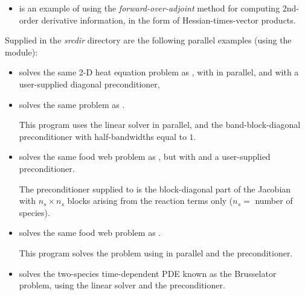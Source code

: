 \begin{itemize}

\item {}
  is an example of using the {\em forward-over-adjoint} method for
  computing 2nd-order derivative information, in the form of Hessian-times-vector
  products.

\end{itemize}


\vspace{0.2in}\noindent 
Supplied in the {\em srcdir} directory are
the following parallel examples (using the {\nvecp} module):

\begin{itemize}


\item {}
  solves the same 2-D heat equation problem as , with {\idaspgmr}
  in parallel, and with a user-supplied diagonal preconditioner,
  
\item {}
  solves the same problem as .

  This program uses the {\idaspgmr} linear solver in parallel,
  and the band-block-diagonal preconditioner {\idabbdpre} with half-bandwidths 
  equal to $1$.

\item {}
  solves the same food web problem as , but with {\idaspgmr}
  and a user-supplied preconditioner.
  
  The preconditioner supplied to {\idaspgmr} is the block-diagonal part of 
  the Jacobian with $n_s \times n_s$ blocks arising from the reaction terms only
  ($n_s =$ number of species).

\item {}
  solves the same food web problem as .

  This program solves the problem using {\idaspgmr} in parallel and the
  {\idabbdpre} preconditioner.

\item {}
  solves the two-species time-dependent PDE known as the Brusselator problem,
  using the {\idaspgmr} linear solver and the {\idabbdpre} preconditioner.


\end{itemize}
